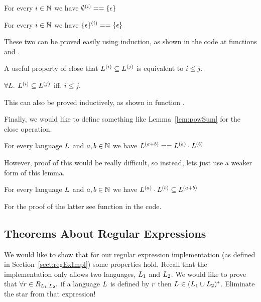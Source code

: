 \begin{lemma}
	\label{lem:nullLangClose}
	For every $i \in \mathbb{N}$ we have $\emptyset^{(i)} == \{\epsilon\}$
\end{lemma}

\begin{lemma}
	\label{lem:unitLangClose}
	For every $i \in \mathbb{N}$ we have $\{\epsilon\}^{(i)} == \{\epsilon\}$
\end{lemma}

These two can be proved easily using induction, as shown in the code at functions  and .

A useful property of close that $L^{(i)} \subseteq L^{(j)}$ is equivalent to $i \le j$.

\begin{lemma}
	\label{lem:subsetCloseLe}
	$\forall L.$  $L^{(i)} \subseteq L^{(j)}$ iff. $i \le j$.
\end{lemma}

This can also be proved inductively, as shown in function .

Finally, we would like to define something like Lemma~\ref{lem:powSum} for the close operation.

\begin{lemma}
	\label{lem:sumCloseSame}
	For every language $L_{}$ and $a,b \in \mathbb{N}$ we have $L^{(a+b)} == L^{(a)} \cdot L^{(b)} $
\end{lemma}

However, proof of this would be really difficult, so instead, lets just use a weaker form of this lemma.

\begin{lemma}
	\label{lem:sumClose}
	For every language $L_{}$ and $a,b \in \mathbb{N}$ we have $L^{(a)} \cdot L^{(b)} \subseteq L^{(a+b)}$
\end{lemma}

For the proof of the latter see function  in the code.

\subsection{Theorems About Regular Expressions}
\label{sect:thmRegEx}
We would like to show that for our regular expression implementation (as defined in Section~\ref{sect:regExImpl}) some properties hold. Recall that the implementation only allows two languages, $L_{1}$ and $L_{2}$. We would like to prove that $\forall r \in R_{L_{1}, L_{2}}.$ if a language $L_{}$ is defined by $r$ then $L_{} \in (L_{1} \cup L_{2})^{*}$. Eliminate the star from that expression!

